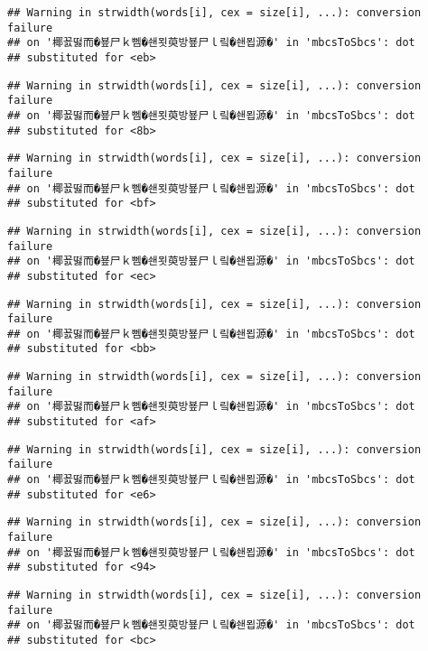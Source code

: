 \documentclass[]{article}
\begin{document}
\begin{verbatim}
## Warning in strwidth(words[i], cex = size[i], ...): conversion failure
## on '椰꾨떯而�뵾尸ｋ뻼�쇈묏萸방뵾尸ｌ맄�쇈묍源�' in 'mbcsToSbcs': dot
## substituted for <eb>
\end{verbatim}

\begin{verbatim}
## Warning in strwidth(words[i], cex = size[i], ...): conversion failure
## on '椰꾨떯而�뵾尸ｋ뻼�쇈묏萸방뵾尸ｌ맄�쇈묍源�' in 'mbcsToSbcs': dot
## substituted for <8b>
\end{verbatim}

\begin{verbatim}
## Warning in strwidth(words[i], cex = size[i], ...): conversion failure
## on '椰꾨떯而�뵾尸ｋ뻼�쇈묏萸방뵾尸ｌ맄�쇈묍源�' in 'mbcsToSbcs': dot
## substituted for <bf>
\end{verbatim}

\begin{verbatim}
## Warning in strwidth(words[i], cex = size[i], ...): conversion failure
## on '椰꾨떯而�뵾尸ｋ뻼�쇈묏萸방뵾尸ｌ맄�쇈묍源�' in 'mbcsToSbcs': dot
## substituted for <ec>
\end{verbatim}

\begin{verbatim}
## Warning in strwidth(words[i], cex = size[i], ...): conversion failure
## on '椰꾨떯而�뵾尸ｋ뻼�쇈묏萸방뵾尸ｌ맄�쇈묍源�' in 'mbcsToSbcs': dot
## substituted for <bb>
\end{verbatim}

\begin{verbatim}
## Warning in strwidth(words[i], cex = size[i], ...): conversion failure
## on '椰꾨떯而�뵾尸ｋ뻼�쇈묏萸방뵾尸ｌ맄�쇈묍源�' in 'mbcsToSbcs': dot
## substituted for <af>
\end{verbatim}

\begin{verbatim}
## Warning in strwidth(words[i], cex = size[i], ...): conversion failure
## on '椰꾨떯而�뵾尸ｋ뻼�쇈묏萸방뵾尸ｌ맄�쇈묍源�' in 'mbcsToSbcs': dot
## substituted for <e6>
\end{verbatim}

\begin{verbatim}
## Warning in strwidth(words[i], cex = size[i], ...): conversion failure
## on '椰꾨떯而�뵾尸ｋ뻼�쇈묏萸방뵾尸ｌ맄�쇈묍源�' in 'mbcsToSbcs': dot
## substituted for <94>
\end{verbatim}

\begin{verbatim}
## Warning in strwidth(words[i], cex = size[i], ...): conversion failure
## on '椰꾨떯而�뵾尸ｋ뻼�쇈묏萸방뵾尸ｌ맄�쇈묍源�' in 'mbcsToSbcs': dot
## substituted for <bc>
\end{verbatim}
\end{document}
